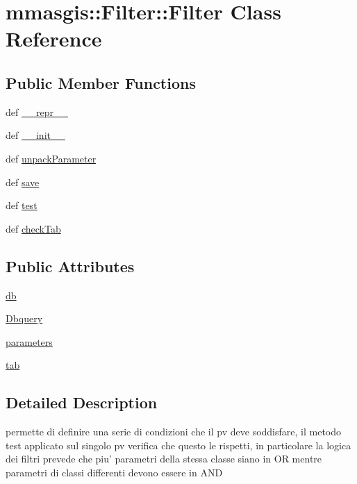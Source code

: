 \hypertarget{classmmasgis_1_1Filter_1_1Filter}{
\section{mmasgis::Filter::Filter Class Reference}
\label{classmmasgis_1_1Filter_1_1Filter}
}
\subsection*{Public Member Functions}
\begin{DoxyCompactItemize}
\item 
def \hyperlink{classmmasgis_1_1Filter_1_1Filter_aa286331e2f7ea07b388ef2e80bb7f19d}{\_\-\_\-repr\_\-\_\-}
\item 
def \hyperlink{classmmasgis_1_1Filter_1_1Filter_a09c5ab11d9ca8ad6cf82c116903dc766}{\_\-\_\-init\_\-\_\-}
\item 
def \hyperlink{classmmasgis_1_1Filter_1_1Filter_a3a749922f6fafac6754f721a7bbe1385}{unpackParameter}
\item 
def \hyperlink{classmmasgis_1_1Filter_1_1Filter_a62594f25ca5126737af8eb0fa9941c0c}{save}
\item 
def \hyperlink{classmmasgis_1_1Filter_1_1Filter_a54b15fff49eee15194c015a94a654e8f}{test}
\item 
def \hyperlink{classmmasgis_1_1Filter_1_1Filter_a3a3258ebcde4ce2f9509bb4f5bdd9da0}{checkTab}
\end{DoxyCompactItemize}
\subsection*{Public Attributes}
\begin{DoxyCompactItemize}
\item 
\hyperlink{classmmasgis_1_1Filter_1_1Filter_a12729c4683da208f75a21ad58cc19be5}{db}
\item 
\hyperlink{classmmasgis_1_1Filter_1_1Filter_a2a2eee1ab8629d4d4d7a7f584d1f6e58}{Dbquery}
\item 
\hyperlink{classmmasgis_1_1Filter_1_1Filter_a3fd36908d325f1493eb8460c431e8ae5}{parameters}
\item 
\hyperlink{classmmasgis_1_1Filter_1_1Filter_adedd3507f6aded578277cb77c8444ee4}{tab}
\end{DoxyCompactItemize}


\subsection{Detailed Description}
\begin{DoxyVerb}
permette di definire una serie di condizioni che il pv deve soddisfare, il metodo test applicato
sul singolo pv verifica che questo le rispetti, in particolare la logica dei filtri prevede che
piu' parametri della stessa classe siano  in OR mentre parametri di classi differenti devono
essere in AND
\end{DoxyVerb}
 


